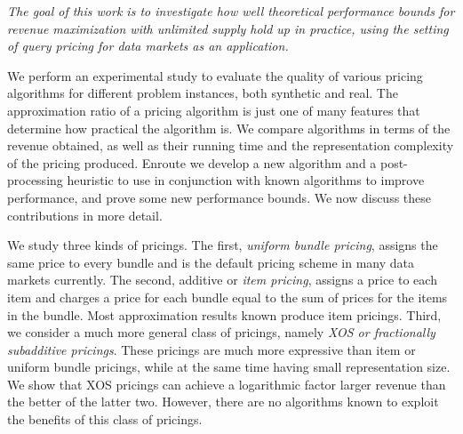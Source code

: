 \vspace{1em}
\noindent
{\em The goal of this work is to investigate how well theoretical performance bounds for revenue maximization with unlimited supply hold up in practice, using the setting of query pricing for data markets as an application.} 
\vspace{1em}

We perform an experimental study to evaluate the quality of various pricing algorithms for different problem instances, both synthetic and real. The approximation ratio of a pricing algorithm is just one of many features that determine how practical the algorithm is. We compare algorithms in terms of the revenue obtained, as well as their running time and the representation complexity of the pricing produced. Enroute we develop a new algorithm and a post-processing heuristic to use in conjunction with known algorithms to improve performance, and prove some new performance bounds. We now discuss these contributions in more detail.

We study three kinds of pricings. The first, {\em uniform bundle pricing}, assigns the same price to every bundle and is the default pricing scheme in many data markets currently. The second, additive or {\em item pricing}, assigns a price to each item and charges a price for each bundle equal to the sum of prices for the items in the bundle. Most approximation results known produce item pricings. Third, we consider a much more general class of pricings, namely {\em XOS or fractionally subadditive pricings}. These pricings are much more expressive than item or uniform bundle pricings, while at the same time having small representation size. We show that XOS pricings can achieve a logarithmic factor larger revenue than the better of the latter two. However, there are no algorithms known to exploit the benefits of this class of pricings.

